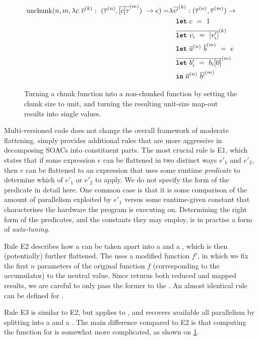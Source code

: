 \begin{figure}

  \begin{align*}
    \textrm{unchunk}(n, m, \Fn{(\nseq{\tau}{n},\nseq{[c]\tau}{m})}{c~\nseq{v}{k}}{e}) =
    & \fn \nseq{v'}{k}: (\nseq{\tau}{n},\nseq{\tau}{m}) \rightarrow \\
    & \quad \kw{let}~c~=~1\\
    & \quad \nseq{\kw{let}~v_{i}~=~[v'_{i}]}{k} \\
    & \quad \kw{let}~\nseq{a}{n}~\nseq{b}{m}~=~e \\
    & \quad \nseq{\kw{let}~b'_{i}~=~b_{i}[0]}{m} \\
    & \quad \kw{in}~\nseq{a}{n}~\nseq{b'}{m}
  \end{align*}
  \caption{Turning a chunk function into a non-chunked function by
    setting the chunk size to unit, and turning the resulting
    unit-size map-out results into single values.}
  \label{fig:unchunking}
\end{figure}

Multi-versioned code does not change the overall framework of moderate
flattening.   simply provides
additional rules that are more aggressive in decomposing SOACs into
constituent parts.  The most crucial rule is E1, which states that if
some expression $e$ can be flattened in two distinct ways $e'_{1}$ and
$e'_{2}$, then $e$ can be flattened to an  expression that uses
some runtime \textit{predicate} to determine which of $e'_{1}$ or
$e'_{2}$ to apply.  We do not specify the form of the predicate in
detail here.  One common case is that it is some comparison of the
amount of parallelism exploited by $e'_{1}$ versus some runtime-given
constant that characterises the hardware the program is executing on.
Determining the right form of the predicates, and the constants they
may employ, is in practise a form of \textit{auto-tuning}.

Rule E2 describes how a  can be taken apart into a
 and a , which is then (potentially) further
flattened.  The  uses a modified function $f'$, in which we
fix the first $n$ parameters of the original function $f$
(corresponding to the accumulator) to the neutral value.  Since
 returns both reduced and mapped results, we are careful
to only pass the former to the .  An almost identical rule
can be defined for .

Rule E3 is similar to E2, but applies to \StreamPar{}, and recovers
available all parallelism by splitting into a  and a
.  The main difference compared to E2 is that computing the
function for  is somewhat more complicated, as shown on
\cref{fig:unchunking}.

